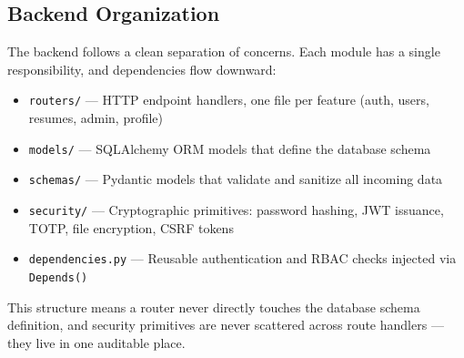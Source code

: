 \begin{center}
\end{center}

\subsection{Backend Organization}

The backend follows a clean separation of concerns. Each module has a single responsibility, and dependencies flow downward:

\begin{itemize}
    \item \texttt{routers/} — HTTP endpoint handlers, one file per feature (auth, users, resumes, admin, profile)
    \item \texttt{models/} — SQLAlchemy ORM models that define the database schema
    \item \texttt{schemas/} — Pydantic models that validate and sanitize all incoming data
    \item \texttt{security/} — Cryptographic primitives: password hashing, JWT issuance, TOTP, file encryption, CSRF tokens
    \item \texttt{dependencies.py} — Reusable authentication and RBAC checks injected via \texttt{Depends()}
\end{itemize}

This structure means a router never directly touches the database schema definition, and security primitives are never scattered across route handlers — they live in one auditable place.

